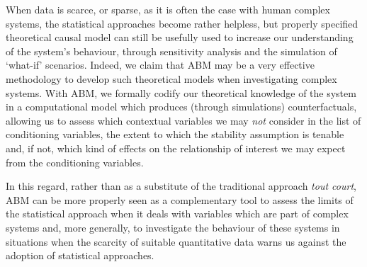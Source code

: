\documentclass[review]{elsarticle}
\begin{document}
When data is scarce, or sparse, as it is often the case with human complex systems, the statistical approaches become rather helpless, but properly specified theoretical causal model can still be usefully used to increase our understanding of the system's behaviour, through sensitivity analysis and the simulation of `what-if' scenarios. Indeed, we claim that ABM may be a very effective methodology to develop such theoretical models when investigating complex systems. With ABM, we formally codify our theoretical knowledge of the system in a computational model which produces (through simulations) counterfactuals, allowing us to assess which contextual variables we may \textit{not} consider in the list of conditioning variables, the extent to which the stability assumption is tenable and, if not, which kind of effects on the relationship of interest we may expect from the conditioning variables. 

In this regard, rather than as a substitute of the traditional approach \textit{tout court}, ABM can be more properly seen as a complementary tool to assess the limits of the statistical approach when it deals with variables which are part of complex systems and, more generally, to investigate the behaviour of these systems in situations when the scarcity of suitable quantitative data warns us against the adoption of statistical approaches.

% 
% 
\end{document}
